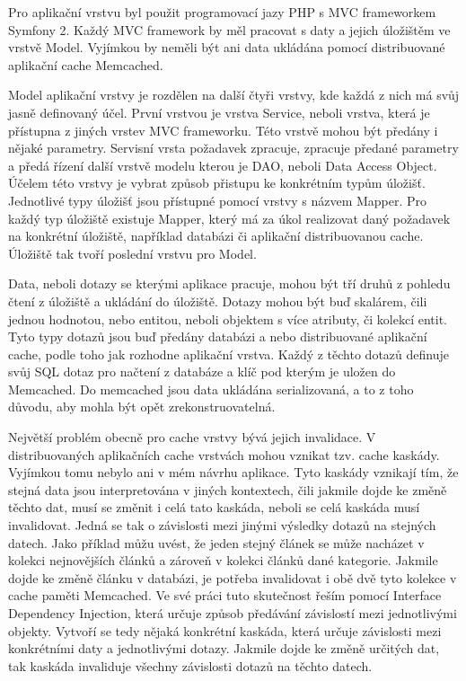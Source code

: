 \documentclass[12pt]{article}
\begin{document}
\label{sec:app-model-memcached}
Pro aplikační vrstvu byl použit programovací jazy PHP s MVC frameworkem Symfony 2. Každý MVC framework by měl pracovat s daty a jejich úložištěm ve vrstvě Model. Vyjímkou by neměli být ani data ukládána pomocí distribuované aplikační cache Memcached.

Model aplikační vrstvy je rozdělen na další čtyři vrstvy, kde každá z nich má svůj jasně definovaný účel. První vrstvou je vrstva Service, neboli vrstva, která je přístupna z jiných vrstev MVC frameworku. Této vrstvě mohou být předány i nějaké parametry. Servisní vrsta požadavek zpracuje, zpracuje předané parametry a předá řízení další vrstvě modelu kterou je DAO, neboli Data Access Object. Účelem této vrstvy je vybrat způsob přistupu ke konkrétním typům úložišť. Jednotlivé typy úložišť jsou přístupné pomocí vrstvy s názvem Mapper. Pro každý typ úložiště existuje Mapper, který má za úkol realizovat daný požadavek na konkrétní úložiště, například databázi či aplikační distribuovanou cache. Úložiště tak tvoří poslední vrstvu pro Model.

Data, neboli dotazy se kterými aplikace pracuje, mohou být tří druhů z pohledu čtení z úložiště a ukládání do úložiště. Dotazy mohou být buď skalárem, čili jednou hodnotou, nebo entitou, neboli objektem s více atributy, či kolekcí entit. Tyto typy dotazů jsou buď předány databázi a nebo distribuované aplikační cache, podle toho jak rozhodne aplikační vrstva. Každý z těchto dotazů definuje svůj SQL dotaz pro načtení z databáze a klíč pod kterým je uložen do Memcached. Do memcached jsou data ukládána serializovaná, a to z toho důvodu, aby mohla být opět zrekonstruovatelná.

Největší problém obecně pro cache vrstvy bývá jejich invalidace. V distribuovaných aplikačních cache vrstvách mohou vznikat tzv. cache kaskády. Vyjímkou tomu nebylo ani v mém návrhu aplikace. Tyto kaskády vznikají tím, že stejná data jsou interpretována v jiných kontextech, čili jakmile dojde ke změně těchto dat, musí se změnit i celá tato kaskáda, neboli se celá kaskáda musí invalidovat. Jedná se tak o závislosti mezi jinými výsledky dotazů na stejných datech. Jako příklad můžu uvést, že jeden stejný článek se může nacházet v kolekci nejnovějších článků a zároveň v kolekci článků dané kategorie. Jakmile dojde ke změně článku v databázi, je potřeba invalidovat i obě dvě tyto kolekce v cache paměti Memcached. Ve své práci tuto skutečnost řeším pomocí Interface Dependency Injection, která určuje způsob předávání závislostí mezi jednotlivými objekty. Vytvoří se tedy nějaká konkrétní kaskáda, která určuje závislosti mezi konkrétními daty a jednotlivými dotazy. Jakmile dojde ke změně určitých dat, tak kaskáda invaliduje všechny závislosti dotazů na těchto datech.
\end{document}
